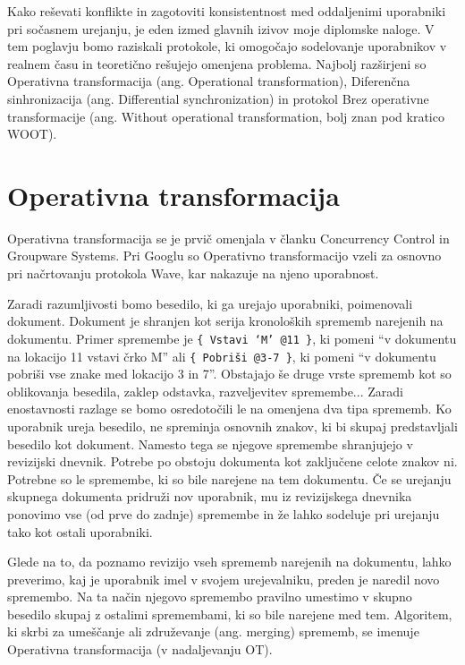 \documentclass[a4paper, 12pt, twoside]{book}
\begin{document}
Kako reševati konflikte in zagotoviti konsistentnost med oddaljenimi uporabniki pri sočasnem urejanju, je eden izmed glavnih izivov moje diplomske naloge. V tem poglavju bomo raziskali protokole, ki omogočajo sodelovanje uporabnikov v realnem času in teoretično rešujejo omenjena problema. Najbolj razširjeni so Operativna transformacija (ang. Operational transformation), Diferenčna sinhronizacija (ang. Differential synchronization) in protokol Brez operativne transformacije (ang. Without operational transformation, bolj znan pod kratico WOOT).

\section{Operativna transformacija}

Operativna transformacija se je prvič omenjala v članku Concurrency Control in Groupware Systems. Pri Googlu so Operativno transformacijo vzeli za osnovno pri načrtovanju protokola Wave, kar nakazuje na njeno uporabnost.

Zaradi razumljivosti bomo besedilo, ki ga urejajo uporabniki, poimenovali dokument. Dokument je shranjen kot serija kronoloških sprememb narejenih na dokumentu. Primer spremembe je {\tt \{ Vstavi ‘M’ @11 \}}, ki pomeni “v dokumentu na lokacijo 11 vstavi črko M” ali {\tt \{ Pobriši @3-7 \}}, ki pomeni “v dokumentu pobriši vse znake med lokacijo 3 in 7”. Obstajajo še druge vrste sprememb kot so oblikovanja besedila, zaklep odstavka, razveljevitev spremembe... Zaradi enostavnosti razlage se bomo osredotočili le na omenjena dva tipa sprememb. Ko uporabnik ureja besedilo, ne spreminja osnovnih znakov, ki bi skupaj predstavljali besedilo kot dokument. Namesto tega se njegove spremembe shranjujejo v revizijski dnevnik. Potrebe po obstoju dokumenta kot zaključene celote znakov ni. Potrebne so le spremembe, ki so bile narejene na tem dokumentu. Če se urejanju skupnega dokumenta pridruži nov uporabnik, mu iz revizijskega dnevnika ponovimo vse (od prve do zadnje) spremembe in že lahko sodeluje pri urejanju tako kot ostali uporabniki.

Glede na to, da poznamo revizijo vseh sprememb narejenih na dokumentu, lahko preverimo, kaj je uporabnik imel v svojem urejevalniku, preden je naredil novo spremembo. Na ta način njegovo spremembo pravilno umestimo v skupno besedilo skupaj z ostalimi spremembami, ki so bile narejene med tem. Algoritem, ki skrbi za umeščanje ali združevanje (ang. merging) sprememb, se imenuje Operativna transformacija (v nadaljevanju OT).
\end{document}
